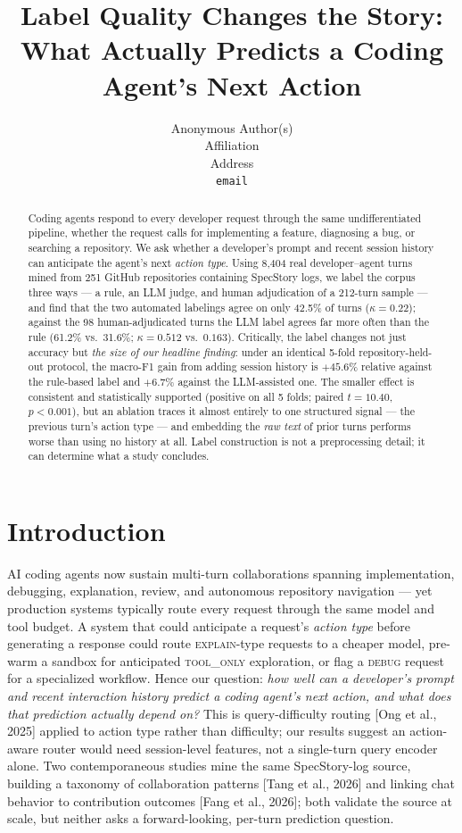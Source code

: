 \documentclass{article}
\title{Label Quality Changes the Story:\\What Actually Predicts a Coding Agent's Next Action}
\author{%
  Anonymous Author(s) \\
  Affiliation \\
  Address \\
  \texttt{email} \\
}
\begin{document}
\maketitle

\begin{abstract}
Coding agents respond to every developer request through the same
undifferentiated pipeline, whether the request calls for implementing a feature,
diagnosing a bug, or searching a repository. We ask whether a developer's prompt
and recent session history can anticipate the agent's next \emph{action type}.
Using 8,404 real developer--agent turns mined from 251 GitHub repositories
containing SpecStory logs, we label the corpus three ways --- a rule, an LLM
judge, and human adjudication of a 212-turn sample --- and find that the two
automated labelings agree on only 42.5\% of turns ($\kappa=0.22$); against the
98 human-adjudicated turns the LLM label agrees far more often than the rule
(61.2\% vs.\ 31.6\%; $\kappa=0.512$ vs.\ $0.163$). Critically, the label changes
not just accuracy but \emph{the size of our headline finding}: under an
identical 5-fold repository-held-out protocol, the macro-F1 gain from adding
session history is $+45.6\%$ relative against the rule-based label and $+6.7\%$
against the LLM-assisted one. The smaller effect is consistent and statistically
supported (positive on all 5 folds; paired $t=10.40$, $p<0.001$), but an
ablation traces it almost entirely to one structured signal --- the previous
turn's action type --- and embedding the \emph{raw text} of prior turns performs
worse than using no history at all. Label construction is not a preprocessing
detail; it can determine what a study concludes.
\end{abstract}

\section{Introduction}

AI coding agents now sustain multi-turn collaborations spanning implementation,
debugging, explanation, review, and autonomous repository navigation --- yet
production systems typically route every request through the same model and tool
budget. A system that could anticipate a request's \emph{action type} before
generating a response could route \textsc{explain}-type requests to a cheaper
model, pre-warm a sandbox for anticipated \textsc{tool\_only} exploration, or
flag a \textsc{debug} request for a specialized workflow. Hence our question:
\emph{how well can a
developer's prompt and recent interaction history predict a coding agent's next
action, and what does that prediction actually depend on?} This is
query-difficulty routing [Ong et al., 2025] applied to action type rather than
difficulty; our results suggest an action-aware router would need session-level
features, not a single-turn query encoder alone. Two contemporaneous studies
mine the same SpecStory-log source, building a taxonomy of collaboration
patterns [Tang et al., 2026] and linking chat behavior to contribution outcomes
[Fang et al., 2026]; both validate the source at scale, but neither asks a
forward-looking, per-turn prediction question.
\end{document}
